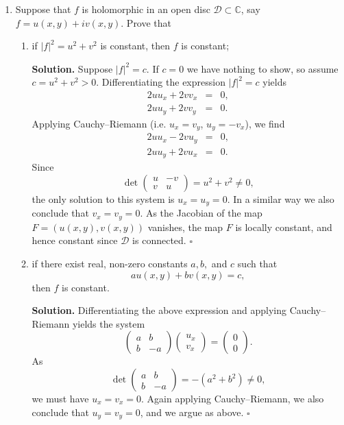 \documentclass[12pt, reqno]{amsart}
\theoremstyle{definition}
\newenvironment{solution}{\par\smallskip\noindent\textbf{Solution.}}{\hfill$\square$\par\medskip}
\numberwithin{equation}{subsection}
\renewcommand{\b}[1]{\mathbf{{#1}}}
\numberwithin{equation}{section}
\begin{document}
\begin{enumerate}
\item Suppose that $f$ is holomorphic in an open disc $\mathcal{D} \subset \mathbb{C}$, say $f= u(x, y) +  i v(x, y)$. Prove that \begin{enumerate}
\item if $|f|^2 = u^2 + v^2$ is constant, then $f$ is constant;
\begin{solution}
Suppose $|f|^2=c$. If $c=0$ we have nothing to show, so assume
$c=u^2+v^2>0$. Differentiating the expression $|f|^2=c$ yields
\begin{eqnarray*}
2uu_x+2vv_x&=&0,\\
2uu_y+2vv_y&=&0.
\end{eqnarray*}
Applying Cauchy--Riemann (i.e. $u_x=v_y$, $u_y=-v_x$), we find
\begin{eqnarray*}
2uu_x-2vu_y&=&0,\\
2uu_y+2vu_x&=&0.
\end{eqnarray*}
Since
\[
\det\begin{pmatrix}u&-v\\v&u\end{pmatrix}=u^2+v^2\neq0,
\]
the only solution to this system is $u_x=u_y=0$. In a similar way we
also conclude that $v_x=v_y=0$. As the Jacobian of the map
$F=(u(x,y),v(x,y))$ vanishes, the map $F$ is locally constant, and hence
constant since $\mathcal D$ is connected.
\end{solution}
\item if there exist real, non-zero constants $a, b,$ and $c$ such that $$ a u (x, y) + b v (x, y) = c, $$ then $f$ is constant.
\begin{solution}
Differentiating the above expression and applying Cauchy--Riemann yields
the system
\[
\begin{pmatrix}a&b\\b&-a\end{pmatrix}
\begin{pmatrix}u_x\\v_x\end{pmatrix}
=\begin{pmatrix}0\\0\end{pmatrix}.
\]
As
\[
\det\begin{pmatrix}a&b\\b&-a\end{pmatrix}=-(a^2+b^2)\neq0,
\]
we must have $u_x=v_x=0$. Again applying Cauchy--Riemann, we also
conclude that $u_y=v_y=0$, and we argue as above.
\end{solution}
\end{enumerate}

\end{enumerate}
\end{document}
